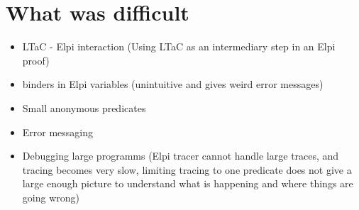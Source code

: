 \documentclass[thesis.tex]{subfiles}
\begin{document}
\section{What was difficult}
\begin{itemize}
    \item LTaC - Elpi interaction (Using LTaC as an intermediary step in an Elpi proof)
    \item binders in Elpi variables (unintuitive and gives weird error messages)
    \item Small anonymous predicates
    \item Error messaging
    \item Debugging large programms (Elpi tracer cannot handle large traces, and tracing becomes very slow, limiting tracing to one predicate does not give a large enough picture to understand what is happening and where things are going wrong)
\end{itemize}
\end{document}
